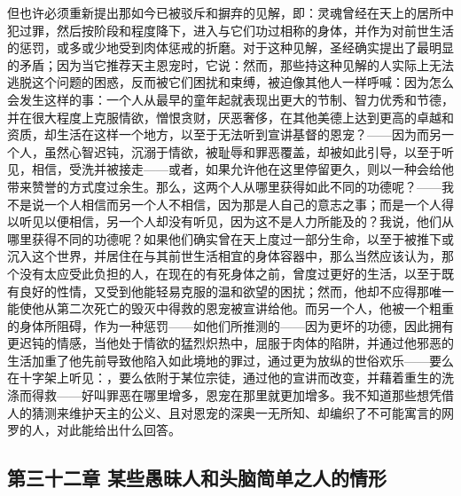 但也许必须重新提出那如今已被驳斥和摒弃的见解，即：灵魂曾经在天上的居所中犯过罪，然后按阶段和程度降下，进入与它们功过相称的身体，并作为对前世生活的惩罚，或多或少地受到肉体惩戒的折磨。对于这种见解，圣经确实提出了最明显的矛盾；因为当它推荐天主恩宠时，它说：然而，那些持这种见解的人实际上无法逃脱这个问题的困惑，反而被它们困扰和束缚，被迫像其他人一样呼喊：因为怎么会发生这样的事：一个人从最早的童年起就表现出更大的节制、智力优秀和节德，并在很大程度上克服情欲，憎恨贪财，厌恶奢侈，在其他美德上达到更高的卓越和资质，却生活在这样一个地方，以至于无法听到宣讲基督的恩宠？——因为而另一个人，虽然心智迟钝，沉溺于情欲，被耻辱和罪恶覆盖，却被如此引导，以至于听见，相信，受洗并被接走——或者，如果允许他在这里停留更久，则以一种会给他带来赞誉的方式度过余生。那么，这两个人从哪里获得如此不同的功德呢？——我不是说一个人相信而另一个人不相信，因为那是人自己的意志之事；而是一个人得以听见以便相信，另一个人却没有听见，因为这不是人力所能及的？我说，他们从哪里获得不同的功德呢？如果他们确实曾在天上度过一部分生命，以至于被推下或沉入这个世界，并居住在与其前世生活相宜的身体容器中，那么当然应该认为，那个没有太应受此负担的人，在现在的有死身体之前，曾度过更好的生活，以至于既有良好的性情，又受到他能轻易克服的温和欲望的困扰；然而，他却不应得那唯一能使他从第二次死亡的毁灭中得救的恩宠被宣讲给他。而另一个人，他被一个粗重的身体所阻碍，作为一种惩罚——如他们所推测的——因为更坏的功德，因此拥有更迟钝的情感，当他处于情欲的猛烈炽热中，屈服于肉体的陷阱，并通过他邪恶的生活加重了他先前导致他陷入如此境地的罪过，通过更为放纵的世俗欢乐——要么在十字架上听见：，要么依附于某位宗徒，通过他的宣讲而改变，并藉着重生的洗涤而得救——好叫罪恶在哪里增多，恩宠在那里就更加增多。我不知道那些想凭借人的猜测来维护天主的公义、且对恩宠的深奥一无所知、却编织了不可能寓言的网罗的人，对此能给出什么回答。\par


\subsection{第三十二章 某些愚昧人和头脑简单之人的情形}

